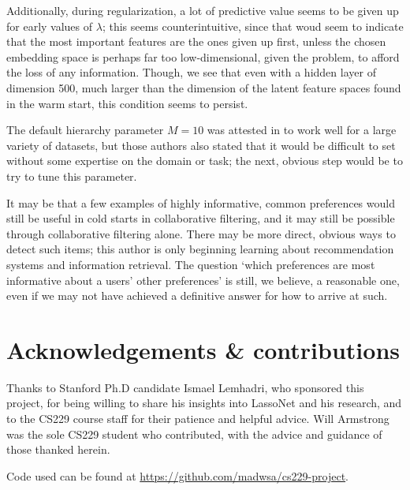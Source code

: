 \documentclass{article}
\begin{document}
Additionally, during regularization, a lot of predictive value seems to
be given up for early values of $\lambda$; this seems counterintuitive,
since that woud seem to indicate that the most important features are the ones
given up first, unless the chosen embedding space is perhaps far too
low-dimensional, given the problem, to afford the loss of any
information.  Though, we see that even with a hidden layer of dimension
500, much larger than the dimension of the latent feature spaces found
in the warm start, this condition seems to persist.

The default hierarchy parameter $M = 10$ was attested in
\cite{lemhadri_lassonet_2021} to work well for a large variety of
datasets, but those authors also stated that it would be difficult to set
without some expertise on the domain or task; the next, obvious step
would be to try to tune this parameter.

It may be that a few examples of highly informative, common preferences
would still be useful in cold starts in collaborative filtering, and it
may still be possible through collaborative filtering alone.  There may
be more direct, obvious ways to detect such items; this author is only
beginning learning about recommendation systems and information
retrieval.  The question `which preferences are most informative about a
users' other preferences' is still, we believe, a reasonable one, even
if we may not have achieved a definitive answer for how to arrive at
such.

\section{Acknowledgements \& contributions}

Thanks to Stanford Ph.D candidate Ismael Lemhadri, who sponsored this
project, for being willing to share his insights into LassoNet and his
research, and to the CS229 course staff for their patience and helpful
advice.  Will Armstrong was the sole CS229 student who contributed, with
the advice and guidance of those thanked herein.

Code used can be found at \url{https://github.com/madwsa/cs229-project}.



\end{document}
